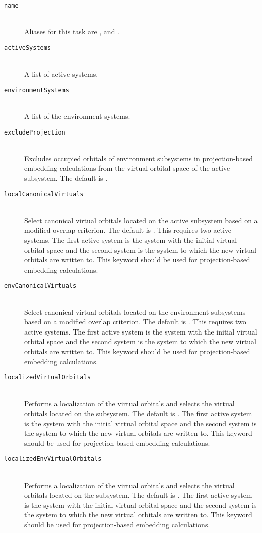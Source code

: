 \begin{description}
	\item[\texttt{name}]\hfill \\
    Aliases for this task are ,  and .
	\item[\texttt{activeSystems}]\hfill \\
	A list of active systems.
	\item[\texttt{environmentSystems}]\hfill \\
	A list of the environment systems.
  \item[\texttt{excludeProjection}]\hfill\\
  Excludes occupied orbitals of environment subsystems in projection-based embedding calculations from the virtual orbital space of the active subsystem. The default is . 
  \item[\texttt{localCanonicalVirtuals}]\hfill\\
  Select canonical virtual orbitals located on the active subsystem based on a modified overlap criterion. The default is . This requires two active systems. The first active system is the system with the initial virtual orbital space and the second system is the system to which the new virtual orbitals are written to. This keyword should be used for projection-based embedding calculations.
  \item[\texttt{envCanonicalVirtuals}]\hfill\\
  Select canonical virtual orbitals located on the environment subsystems based on a modified overlap criterion. The default is . This requires two active systems. The first active system is the system with the initial virtual orbital space and the second system is the system to which the new virtual orbitals are written to. This keyword should be used for projection-based embedding calculations.
  \item[\texttt{localizedVirtualOrbitals}]\hfill\\
  Performs a localization of the virtual orbitals and selects the virtual orbitals located on the subsystem. The default is . The first active system is the system with the initial virtual orbital space and the second system is the system to which the new virtual orbitals are written to. This keyword should be used for projection-based embedding calculations.
  \item[\texttt{localizedEnvVirtualOrbitals}]\hfill\\
  Performs a localization of the virtual orbitals and selects the virtual orbitals located on the subsystem. The default is . The first active system is the system with the initial virtual orbital space and the second system is the system to which the new virtual orbitals are written to. This keyword should be used for projection-based embedding calculations.
\end{description}
